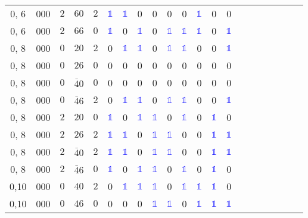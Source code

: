 \begin{longtable*}{c| cccccccccccccccccccc }
0, 6& 000& $2$& $60$& $2$& \textcolor{blue}{$\mathds{1}$}& \textcolor{blue}{$\mathds{1}$}& 0& 0& 0& 0& \textcolor{blue}{$\mathds{1}$}& 0& 0\\
0, 6& 000& $2$& $66$& $0$& \textcolor{blue}{$\mathds{1}$}& 0& \textcolor{blue}{$\mathds{1}$}& 0& \textcolor{blue}{$\mathds{1}$}& \textcolor{blue}{$\mathds{1}$}& \textcolor{blue}{$\mathds{1}$}& 0& \textcolor{blue}{$\mathds{1}$}\\
0, 8& 000& $0$& $20$& $2$& 0& \textcolor{blue}{$\mathds{1}$}& \textcolor{blue}{$\mathds{1}$}& 0& \textcolor{blue}{$\mathds{1}$}& \textcolor{blue}{$\mathds{1}$}& 0& 0& \textcolor{blue}{$\mathds{1}$}\\
0, 8& 000& $0$& $26$& $0$& 0& 0& 0& 0& 0& 0& 0& 0& 0\\
0, 8& 000& $0$& $\bar{4}0$& $0$& 0& 0& 0& 0& 0& 0& 0& 0& 0\\
0, 8& 000& $0$& $\bar{4}6$& $2$& 0& \textcolor{blue}{$\mathds{1}$}& \textcolor{blue}{$\mathds{1}$}& 0& \textcolor{blue}{$\mathds{1}$}& \textcolor{blue}{$\mathds{1}$}& 0& 0& \textcolor{blue}{$\mathds{1}$}\\
0, 8& 000& $2$& $20$& $0$& \textcolor{blue}{$\mathds{1}$}& 0& \textcolor{blue}{$\mathds{1}$}& \textcolor{blue}{$\mathds{1}$}& 0& \textcolor{blue}{$\mathds{1}$}& 0& \textcolor{blue}{$\mathds{1}$}& 0\\
0, 8& 000& $2$& $26$& $2$& \textcolor{blue}{$\mathds{1}$}& \textcolor{blue}{$\mathds{1}$}& 0& \textcolor{blue}{$\mathds{1}$}& \textcolor{blue}{$\mathds{1}$}& 0& 0& \textcolor{blue}{$\mathds{1}$}& \textcolor{blue}{$\mathds{1}$}\\
0, 8& 000& $2$& $\bar{4}0$& $2$& \textcolor{blue}{$\mathds{1}$}& \textcolor{blue}{$\mathds{1}$}& 0& \textcolor{blue}{$\mathds{1}$}& \textcolor{blue}{$\mathds{1}$}& 0& 0& \textcolor{blue}{$\mathds{1}$}& \textcolor{blue}{$\mathds{1}$}\\
0, 8& 000& $2$& $\bar{4}6$& $0$& \textcolor{blue}{$\mathds{1}$}& 0& \textcolor{blue}{$\mathds{1}$}& \textcolor{blue}{$\mathds{1}$}& 0& \textcolor{blue}{$\mathds{1}$}& 0& \textcolor{blue}{$\mathds{1}$}& 0\\
0,10& 000& $0$& $40$& $2$& 0& \textcolor{blue}{$\mathds{1}$}& \textcolor{blue}{$\mathds{1}$}& \textcolor{blue}{$\mathds{1}$}& 0& \textcolor{blue}{$\mathds{1}$}& \textcolor{blue}{$\mathds{1}$}& \textcolor{blue}{$\mathds{1}$}& 0\\
0,10& 000& $0$& $46$& $0$& 0& 0& 0& \textcolor{blue}{$\mathds{1}$}& \textcolor{blue}{$\mathds{1}$}& 0& \textcolor{blue}{$\mathds{1}$}& \textcolor{blue}{$\mathds{1}$}& \textcolor{blue}{$\mathds{1}$}\\

\end{longtable*}
